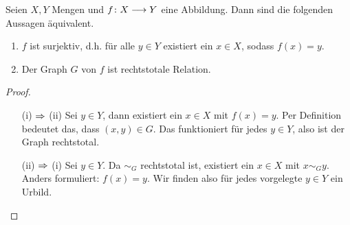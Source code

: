 
\begin{bem}

  Seien $X, Y$ Mengen und $f\colon X \longrightarrow Y$ eine Abbildung. Dann sind
  die folgenden Aussagen äquivalent.

  \begin{enumerate}

    \item $f$ ist surjektiv, d.h. für alle $y\in Y$ existiert ein $x\in
      X$, sodass $f(x)=y$.



    \item Der Graph $G$ von $f$ ist rechtstotale Relation.

  \end{enumerate}

  \begin{proof}
    \quad

    \begin{itemize}
    
      \item[\tiny{(i) $\Rightarrow$ (ii)}] Sei $y\in Y$, dann existiert ein $x\in X$ mit
        $f(x)=y$. Per Definition bedeutet das, dass $(x, y) \in G$. Das
        funktioniert für jedes $y\in Y$, also ist der Graph rechtstotal.



      \item[\tiny{(ii) $\Rightarrow$ (i)}] Sei $y\in Y$. Da $\sim_{G}$ rechtstotal ist,
        existiert ein $x\in X$ mit $x\sim_{G} y$. Anders formuliert: $f(x) = y$.
        Wir finden also für jedes vorgelegte $y \in Y$ ein Urbild.

    \end{itemize}
    
  \end{proof}

\end{bem}

